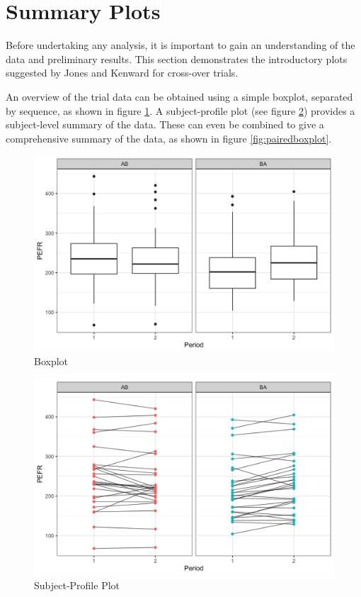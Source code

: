 \documentclass[12pt, TexShade, letterpaper]{report}
\begin{document}
\section{Summary Plots}
Before undertaking any analysis, it is important to gain an understanding of the data and preliminary results. This section demonstrates the introductory plots suggested by Jones and Kenward \cite{jones2003design} for cross-over trials.

An overview of the trial data can be obtained using a simple boxplot, separated by sequence, as shown in figure \ref{fig:boxplot}. A subject-profile plot (see figure \ref{fig:subjectprofile}) provides a subject-level summary of the data. These can even be combined to give a comprehensive summary of the data, as shown in figure \ref{fig:pairedboxplot}.

\begin{figure}[ht]
    \centering
    \includegraphics[width=0.85\linewidth]{report/figures/boxplot.png}
    \caption{Boxplot}
    \label{fig:boxplot}
\end{figure}
\begin{figure}[ht]
    \centering
    \includegraphics[width=0.85\linewidth]{report/figures/subjectProfilesPlot.png}
    \caption{Subject-Profile Plot}
    \label{fig:subjectprofile}
\end{figure}
\end{document}
